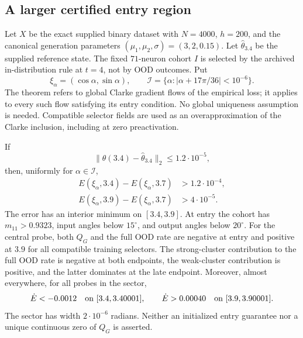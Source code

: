 \subsection{A larger certified entry region}
Let $X$ be the exact supplied binary dataset with $N=4000$, $h=200$,
and the canonical generation parameters $(\mu_1,\mu_2,\sigma)=(3,2,0.15)$.
Let $\widehat\theta_{3.4}$ be the supplied reference state. The fixed
$71$-neuron cohort $I$ is selected by the archived in-distribution rule at
$t=4$, not by OOD outcomes. Put
\[
 \xi_\alpha=(\cos\alpha,\sin\alpha),\qquad
 \mathcal I=\{\alpha:|\alpha+17\pi/36|<10^{-6}\}.
\]
The theorem refers to global Clarke gradient flows of the empirical loss;
it applies to every such flow satisfying its entry condition. No global
uniqueness assumption is needed. Compatible selector fields are used as an
overapproximation of the Clarke inclusion, including at zero preactivation.

\begin{theorem}
\label{initcert:wide-theorem}
If
\begin{equation}\label{initcert:entry}
 \|\theta(3.4)-\widehat\theta_{3.4}\|_2\le1.2\cdot10^{-5},
\end{equation}
then, uniformly for $\alpha\in\mathcal I$,
\begin{align*}
 E(\xi_\alpha,3.4)-E(\xi_\alpha,3.7)&>1.2\cdot10^{-4},\\
 E(\xi_\alpha,3.9)-E(\xi_\alpha,3.7)&>4\cdot10^{-5}.
\end{align*}
The error has an interior minimum on $[3.4,3.9]$. At entry the cohort has
$m_{11}>0.9323$, input angles below $15^\circ$, and output angles below
$20^\circ$. For the central probe, both $Q_G$ and the full OOD rate are
negative at entry and positive at $3.9$ for all compatible training selectors.
The strong-cluster contribution to the full OOD rate is negative at both
endpoints, the weak-cluster contribution is positive, and the latter
dominates at the late endpoint.
Moreover, almost everywhere, for all probes in the sector,
\[
 \dot E<-0.0012\quad\hbox{on }[3.4,3.40001],\qquad
 \dot E>0.00040\quad\hbox{on }[3.9,3.90001].
\]
The sector has width $2\cdot10^{-6}$ radians. Neither an initialized
entry guarantee nor a unique continuous zero of $Q_G$ is asserted.
\end{theorem}

